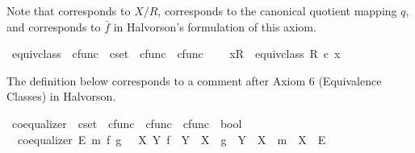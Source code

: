 \begin{isabellebody}
\begin{isamarkuptext}%
Note that \isa{{\isacharparenleft}{\kern0pt}{\isasymsslash}{\isacharparenright}{\kern0pt}} corresponds to $X/R$,  corresponds to the
  canonical quotient mapping $q$, and  corresponds to $\bar{f}$ in Halvorson's
  formulation of this axiom.%
\end{isamarkuptext}\isamarkuptrue%
\isamarkupfalse%
\ equiv{\isacharunderscore}{\kern0pt}class{\isacharprime}{\kern0pt}\ {\isacharcolon}{\kern0pt}{\isacharcolon}{\kern0pt}\ {\isachardoublequoteopen}cfunc\ {\isasymRightarrow}\ cset\ {\isasymtimes}\ cfunc\ {\isasymRightarrow}\ cfunc{\isachardoublequoteclose}\ {\isacharparenleft}{\kern0pt}{\isachardoublequoteopen}{\isacharbrackleft}{\kern0pt}{\isacharunderscore}{\kern0pt}{\isacharbrackright}{\kern0pt}\isactrlbsub {\isacharunderscore}{\kern0pt}\isactrlesub {\isachardoublequoteclose}{\isacharparenright}{\kern0pt}\ \isanewline
\ \ {\isachardoublequoteopen}{\isacharbrackleft}{\kern0pt}x{\isacharbrackright}{\kern0pt}\isactrlbsub R\isactrlesub \ {\isasymequiv}\ equiv{\isacharunderscore}{\kern0pt}class\ R\ {\isasymcirc}\isactrlsub c\ x{\isachardoublequoteclose}%
\isadelimdocument
%
\endisadelimdocument
%
\isatagdocument
%
\isamarkuptrue%
%
\isamarkuptrue%
%
\endisatagdocument
{\isafolddocument}%
%
\isadelimdocument
%
\endisadelimdocument
%
\begin{isamarkuptext}%
The definition below corresponds to a comment after Axiom 6 (Equivalence Classes) in Halvorson.%
\end{isamarkuptext}\isamarkuptrue%
\isamarkupfalse%
\ coequalizer\ {\isacharcolon}{\kern0pt}{\isacharcolon}{\kern0pt}\ {\isachardoublequoteopen}cset\ {\isasymRightarrow}\ cfunc\ {\isasymRightarrow}\ cfunc\ {\isasymRightarrow}\ cfunc\ {\isasymRightarrow}\ bool{\isachardoublequoteclose}\ \isanewline
\ \ {\isachardoublequoteopen}coequalizer\ E\ m\ f\ g\ {\isasymlongleftrightarrow}\ {\isacharparenleft}{\kern0pt}{\isasymexists}\ X\ Y{\isachardot}{\kern0pt}\ {\isacharparenleft}{\kern0pt}f\ {\isacharcolon}{\kern0pt}\ Y\ {\isasymrightarrow}\ X{\isacharparenright}{\kern0pt}\ {\isasymand}\ {\isacharparenleft}{\kern0pt}g\ {\isacharcolon}{\kern0pt}\ Y\ {\isasymrightarrow}\ X{\isacharparenright}{\kern0pt}\ {\isasymand}\ {\isacharparenleft}{\kern0pt}m\ {\isacharcolon}{\kern0pt}\ X\ {\isasymrightarrow}\ E{\isacharparenright}{\kern0pt}\isanewline

\end{isabellebody}
